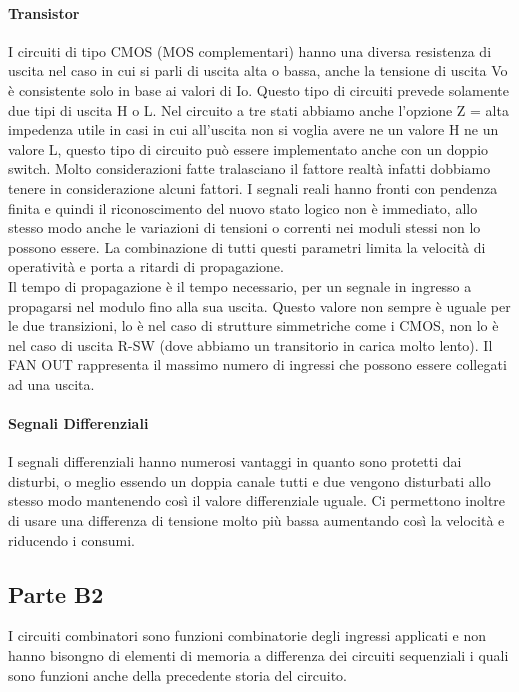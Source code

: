 \documentclass[12pt]{article}
\begin{document}
\paragraph{Transistor} I circuiti di tipo CMOS (MOS complementari) hanno una diversa resistenza di uscita nel caso in cui si parli di uscita alta o bassa, anche la tensione di uscita Vo è consistente solo in base ai valori di Io. Questo tipo di circuiti prevede solamente due tipi di uscita H o L. Nel circuito a tre stati abbiamo anche l’opzione Z = alta impedenza utile in casi in cui all’uscita non si voglia avere ne un valore H ne un valore L, questo tipo di circuito può essere implementato anche con un doppio switch. Molto considerazioni fatte tralasciano il fattore realtà infatti dobbiamo tenere in considerazione alcuni fattori. I segnali reali hanno fronti con pendenza finita e quindi il riconoscimento del nuovo stato logico non è immediato, allo stesso modo anche le variazioni di tensioni o correnti nei moduli stessi non lo possono essere. La combinazione di tutti questi parametri limita la velocità di operatività e porta a ritardi di propagazione.\\
Il tempo di propagazione è il tempo necessario, per un segnale in ingresso a propagarsi nel modulo fino alla sua uscita. Questo valore non sempre è uguale per le due transizioni, lo è nel caso di strutture simmetriche come i CMOS, non lo è nel caso di uscita R-SW (dove abbiamo un transitorio in carica molto lento). Il FAN OUT rappresenta il massimo numero di ingressi che possono essere collegati ad una uscita.
\paragraph{Segnali Differenziali} I segnali differenziali hanno numerosi vantaggi in quanto sono protetti dai disturbi, o meglio essendo un doppia canale tutti e due vengono disturbati allo stesso modo mantenendo così il valore differenziale uguale. Ci permettono inoltre di usare una differenza di tensione molto più bassa aumentando così la velocità e riducendo i consumi.

\subsection{Parte B2}\label{b2}
I circuiti combinatori sono funzioni combinatorie degli ingressi applicati e non hanno bisongno di elementi di memoria a differenza dei circuiti sequenziali i quali sono funzioni anche della precedente storia del circuito.
\end{document}
